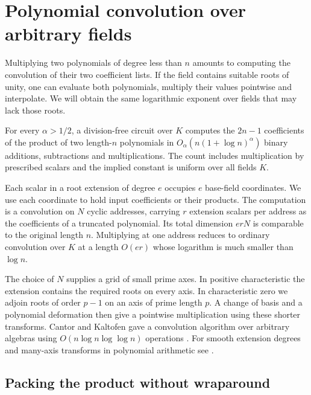 \section{Polynomial convolution over arbitrary fields}\label{sec:pack}

Multiplying two polynomials of degree less than $n$ amounts to
computing the convolution of their two coefficient lists. If the field
contains suitable roots of unity, one can evaluate both polynomials,
multiply their values pointwise and interpolate. We will obtain the same
logarithmic exponent over fields that may lack those roots.

\begin{theorem}\label{thm:conv}
For every $\alpha>1/2$, a division-free circuit over $K$ computes the
$2n-1$ coefficients of the product of two length-$n$ polynomials in
$O_\alpha(n(1+\log n)^\alpha)$ binary additions, subtractions and
multiplications. The count includes multiplication by prescribed scalars
and the implied constant is uniform over all fields $K$.
\end{theorem}

Each scalar in a root extension of degree $e$ occupies $e$ base-field
coordinates. We use each coordinate to hold input coefficients or
their products. The computation is a convolution on $N$ cyclic
addresses, carrying $r$ extension scalars per address as the
coefficients of a truncated polynomial.
Its total dimension $erN$ is comparable to the original length $n$.
Multiplying at one address reduces to ordinary convolution over $K$
at a length $O(er)$ whose logarithm is much smaller than $\log n$.

The choice of $N$ supplies a grid of small prime axes. In positive
characteristic the extension contains the required roots on every axis.
In characteristic zero we adjoin roots of order $p-1$ on an axis of
prime length $p$. A change of basis and a polynomial deformation then
give a pointwise multiplication using these shorter transforms.
Cantor and Kaltofen gave a convolution algorithm over arbitrary
algebras using $O(n\log n\log\log n)$ operations
\cite{CantorKaltofen}. For smooth extension degrees and many-axis
transforms in polynomial arithmetic see
\cite{harveyhoevenfinite,harveyhoevenconditional}.

\subsection{Packing the product without wraparound}

